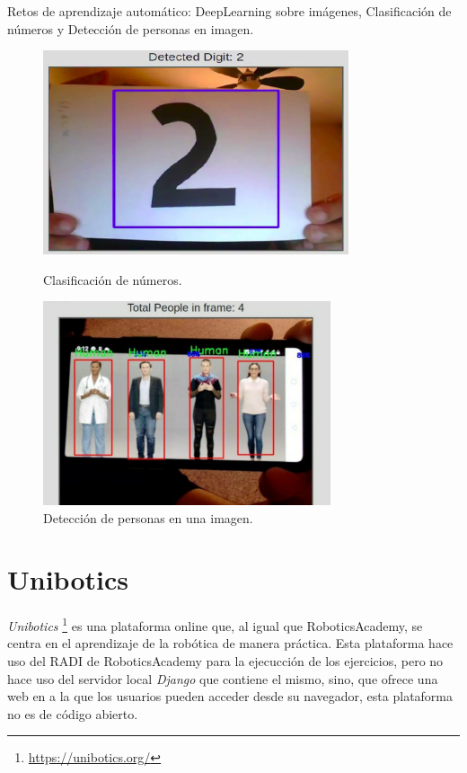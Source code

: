 \documentclass[a4paper, 12pt]{book}
\begin{document}
Retos de aprendizaje automático: DeepLearning sobre imágenes, Clasificación de números y Detección de personas en imagen.
\begin{figure}[H]
  \centering
  \begin{minipage}[b]{0.4\textwidth}
    \includegraphics[width=\textwidth,height=60mm]{img/dl_imagenes}
    \caption{Clasificación de números.}
  \end{minipage}
  \hfill
  \begin{minipage}[b]{0.4\textwidth}
    \includegraphics[width=\textwidth,height=60mm]{img/deteccion_personas}
    \caption{Detección de personas en una imagen.}
  \end{minipage}
\end{figure}

\section{Unibotics}
\label{section:unibotics}

\emph{Unibotics} \footnote{\url{https://unibotics.org/}} es una plataforma online que, al igual que RoboticsAcademy, se centra en el aprendizaje de la robótica de manera práctica. Esta plataforma hace uso del RADI de RoboticsAcademy para la ejecucción de los ejercicios, pero no hace uso del servidor local \emph{Django} que contiene el mismo, sino, que ofrece una web en a la que los usuarios pueden acceder desde su navegador, esta plataforma no es de código abierto.
\end{document}
